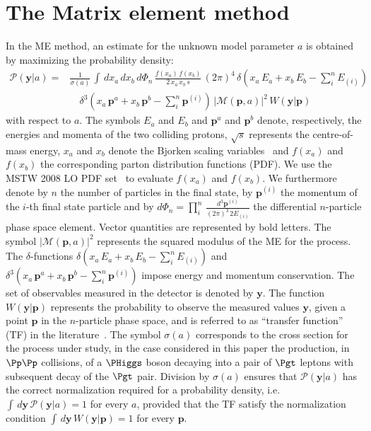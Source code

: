 \section{The Matrix element method}
\label{sec:mem}

In the ME method, an estimate for the unknown model parameter $a$
is obtained by maximizing the probability density:
\begin{align}
\mathcal{P}(\bm{y}|a) = & \frac{1}{\sigma(a)} \, \int \, dx_{a} \, dx_{b} \,
d\Phi_{n} \, \frac{f(x_{a}) \, f(x_{b})}{2 \, x_{a} \, x_{b} \, s} \, (2\pi)^{4} \,
\delta( x_{a} \, E_{a} + x_{b} \, E_{b} - \sum_{i}^{n}
E_{(i)}) \, \nonumber \\
 & \quad \delta^{3}( x_{a} \, \bm{p}^{a} + x_{b} \, \bm{p}^{b} - \sum_{i}^{n}
\bm{p}^{(i)}) \, 
  \vert \mathcal{M}(\bm{p},a) \vert^{2} \, W(\bm{y}|\bm{p}) 
\label{eq:mem}
\end{align}
with respect to $a$.
The symbols $E_{a}$ and $E_{b}$ and $\bm{p}^{a}$ and $\bm{p}^{b}$ denote, respectively, the energies and momenta of the two colliding protons,
$\sqrt{s}$ represents the centre-of-mass energy,
$x_{a}$ and $x_{b}$ denote the Bjorken scaling variables~\cite{Bjorkenx}
and $f(x_{a})$ and $f(x_{b})$ the corresponding parton distribution
functions (PDF).
We use the MSTW 2008 LO PDF set~\cite{MSTW} to evaluate $f(x_{a})$ and $f(x_{b})$.
We furthermore denote by $n$ the number of particles in the final state,
by $\bm{p}^{(i)}$ the momentum of the $i$-th final state particle
and by $d\Phi_{n} = \prod_{i}^{n} \,
\frac{d^{3}\bm{p}^{(i)}}{(2\pi)^{3} \, 2 E_{(i)}}$ the differential $n$-particle
phase space element.
Vector quantities are represented by bold letters.
The symbol $\vert \mathcal{M}(\bm{p},a) \vert^{2}$ represents the
squared modulus of the ME for
the process.
The $\delta$-functions $\delta( x_{a} \, E_{a} + x_{b} \, E_{b} - \sum_{i}^{n} E_{(i)})$
and $\delta^{3}( x_{a} \, \bm{p}^{a} + x_{b} \, \bm{p}^{b} - \sum_{i}^{n} \bm{p}^{(i)})$ 
impose energy and momentum conservation.
The set of observables measured in the
detector is denoted by $\bm{y}$.
The function $W(\bm{y}|\bm{p})$ represents the probability to
observe the measured values $\bm{y}$, given a point $\bm{p}$ in the
$n$-particle phase space, and
is referred to as ``transfer function'' (TF) in the
literature~\cite{Fiedler:2010sg,Volobouev:2011vb}.
The symbol $\sigma(a)$ corresponds to the cross section for the process under study,
in the case considered in this paper the production, in $\Pp\Pp$
collisions, of a $\PHiggs$ boson decaying into a pair of $\Pgt$ leptons
with subsequent decay of the $\Pgt$ pair.
Division by $\sigma(a)$ ensures that $\mathcal{P}(\bm{y}|a)$ has
the correct normalization required for a probability density, 
i.e. $\int \, d\bm{y} \, \mathcal{P}(\bm{y}|a) = 1$ for every $a$, 
provided that the TF satisfy the normalization condition
$\int \, d\bm{y}\, W(\bm{y}|\bm{p}) = 1$
for every $\bm{p}$.

